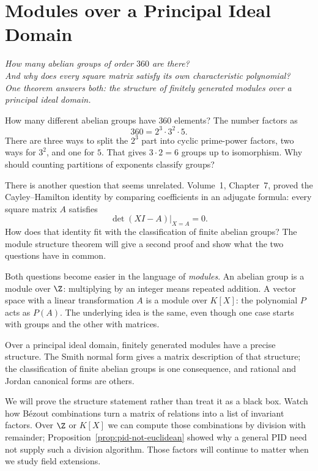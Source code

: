 \chapter{Modules over a Principal Ideal Domain}

\begin{center}\itshape
How many abelian groups of order $360$ are there?\\
And why does every square matrix satisfy its own characteristic polynomial?\\
One theorem answers both: the structure of finitely generated modules over a principal ideal domain.
\end{center}

How many different abelian groups have $360$ elements? The number factors as
\[
360=2^3\cdot3^2\cdot5.
\]
There are three ways to split the $2^3$ part into cyclic prime-power factors, two ways for $3^2$, and one for $5$. That gives $3\cdot2=6$ groups up to isomorphism. Why should counting partitions of exponents classify groups?

There is another question that seems unrelated. Volume~1, Chapter~7,
proved the Cayley--Hamilton identity by comparing coefficients in an
adjugate formula: every square matrix $A$ satisfies
\[
\det(XI-A)\big|_{X=A}=0.
\]
How does that identity fit with the classification of finite abelian
groups? The module structure theorem will give a second proof and show
what the two questions have in common.

Both questions become easier in the language of \emph{modules}. An abelian group is a module over $\Z$: multiplying by an integer means repeated addition. A vector space with a linear transformation $A$ is a module over $K[X]$: the polynomial $P$ acts as $P(A)$. The underlying idea is the same, even though one case starts with groups and the other with matrices.

Over a principal ideal domain, finitely generated modules have a precise structure. The Smith normal form gives a matrix description of that structure; the classification of finite abelian groups is one consequence, and rational and Jordan canonical forms are others.

We will prove the structure statement rather than treat it as a black box. Watch how Bézout combinations turn a matrix of relations into a list of invariant factors. Over $\Z$ or $K[X]$ we can compute those combinations by division with remainder; Proposition~\ref{prop:pid-not-euclidean} showed why a general PID need not supply such a division algorithm. Those factors will continue to matter when we study field extensions.

